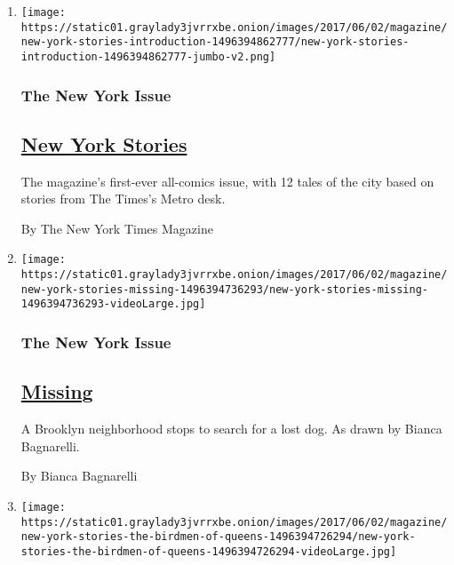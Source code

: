 \begin{enumerate}
\def\labelenumi{\arabic{enumi}.}
\item
  \texttt{[image: https://static01.graylady3jvrrxbe.onion/images/2017/06/02/magazine/new-york-stories-introduction-1496394862777/new-york-stories-introduction-1496394862777-jumbo-v2.png]}

  \hypertarget{the-new-york-issue}{%
  \subsubsection{The New York Issue}\label{the-new-york-issue}}

  \hypertarget{new-york-stories}{%
  \subsection{\texorpdfstring{\href{/interactive/2017/06/02/magazine/new-york-stories-introduction.html}{New
  York Stories}}{New York Stories}}\label{new-york-stories}}

  The magazine's first-ever all-comics issue, with 12 tales of the city
  based on stories from The Times's Metro desk.

  By The New York Times Magazine
\item
  \texttt{[image: https://static01.graylady3jvrrxbe.onion/images/2017/06/02/magazine/new-york-stories-missing-1496394736293/new-york-stories-missing-1496394736293-videoLarge.jpg]}

  \hypertarget{the-new-york-issue-1}{%
  \subsubsection{The New York Issue}\label{the-new-york-issue-1}}

  \hypertarget{missing}{%
  \subsection{\texorpdfstring{\href{/interactive/2017/06/02/magazine/new-york-stories-missing.html}{Missing}}{Missing}}\label{missing}}

  A Brooklyn neighborhood stops to search for a lost dog. As drawn by
  Bianca Bagnarelli.

  By Bianca Bagnarelli
\item
  \texttt{[image: https://static01.graylady3jvrrxbe.onion/images/2017/06/02/magazine/new-york-stories-the-birdmen-of-queens-1496394726294/new-york-stories-the-birdmen-of-queens-1496394726294-videoLarge.jpg]}


\end{enumerate}
